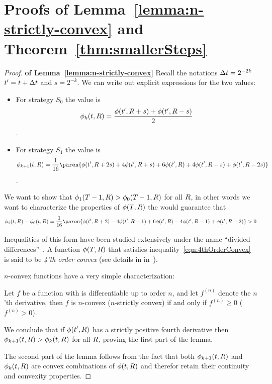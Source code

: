 \documentclass[12pt]{article} %
\begin{document}
\section{Proofs of Lemma~\ref{lemma:n-strictly-convex} and Theorem~\ref{thm:smallerSteps}}
\label{proofs:n-strictly-convex-smallerSteps}
\begin{proof}{\bf of Lemma~\ref{lemma:n-strictly-convex}}
Recall the notations $\Delta t = 2^{-2k}$ $t' = t+\Delta t$ and $s=2^{-k}$.
We can write out explicit expressions for the two values:
\begin{itemize}
\item For strategy $S_0$ the value is
  $$\phi_k(t, R) = \frac{\phi(t',R+s)+ \phi(t',R-s)}{2} $$.
\item For strategy $S_1$ the value is
  $$\pot_{k+1}(t, \R) = \frac{1}{16}
  \paren{\pot(t',\R+2s)+ 4\pot(t',\R+s)+ 6\pot(t',\R)+  4\pot(t',\R-s)+ \pot(t',\R-2s)}
  $$.
\end{itemize}

We want to show that $\phi_1(T-1,R) > \phi_0(T-1,R)$ for all $R$, in
other words we want to characterize the properties of $\phi(T,R)$ the
would guarantee that
\begin{equation} \label{eqn:4thOrderConvex}
\pot_1(t,\R) - \pot_0(t,\R) =
\frac{1}{16}
\paren{ \pot(t',\R+2) - 4\pot(t',\R+1) +6\pot(t',\R) - 4\pot(t',\R-1) +\pot(t',\R-2)} > 0
\end{equation}

Inequalities of this form have been studied extensively under the name
``divided differences''~\cite{popoviciu1965certaines,butt2016generalization, de2005divided}.
A function $\phi(T,R)$ that satisfies
inequality~\ref{eqn:4thOrderConvex} is said to be {\em 4'th order convex}
(see details in in~\cite{butt2016generalization}).

$n$-convex functions have a very simple characterization:
\begin{theorem}
  Let $f$ be a  function with is differentiable up to order $n$, and
  let $f^{(n)}$ denote the $n$'th derivative, then $f$ is $n$-convex
  ($n$-strictly convex) if and only if $f^{(n)} \geq 0$ ($f^{(n)} > 0$).
\end{theorem}

We conclude that if $\phi(t',R)$ has a strictly positive fourth
derivative then $\phi_{k+1}(t,R) > \phi_{k}(t,R)$ for all $R$, proving
the first part of the lemma.

The second part of the lemma follows from the fact that
both $\phi_{k+1}(t,R)$ and $\phi_{k}(t,R)$ are convex combinations of
$\phi(t,R)$ and therefor retain their continuity and convexity properties.
\end{proof}
\end{document}
